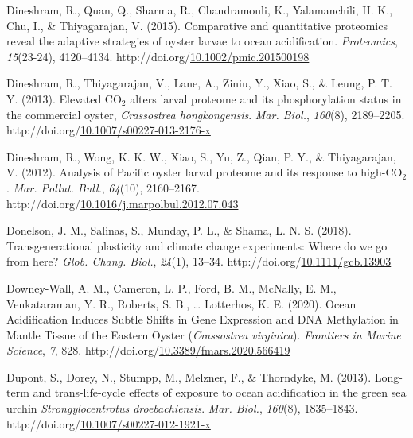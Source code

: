 \documentclass [11pt, proquest] {uwthesis}[2015/03/03]
\newlength{\cslhangindent}
\newenvironment{CSLReferences}%
{\setlength{\parindent}{0pt}%
\everypar{\setlength{\hangindent}{\cslhangindent}}\ignorespaces}%
{\par}
\begin{document}
\begin{CSLReferences}{1}{0}
\leavevmode\hypertarget{ref-Dineshram2015}{}%
Dineshram, R., Quan, Q., Sharma, R., Chandramouli, K., Yalamanchili, H. K., Chu, I., \& Thiyagarajan, V. (2015). {Comparative and quantitative proteomics reveal the adaptive strategies of oyster larvae to ocean acidification}. \emph{Proteomics}, \emph{15}(23-24), 4120--4134. http://doi.org/\href{https://doi.org/10.1002/pmic.201500198}{10.1002/pmic.201500198}

\leavevmode\hypertarget{ref-Dineshram2013}{}%
Dineshram, R., Thiyagarajan, V., Lane, A., Ziniu, Y., Xiao, S., \& Leung, P. T. Y. (2013). {Elevated {CO\(_2\)} alters larval proteome and its phosphorylation status in the commercial oyster, \emph{Crassostrea hongkongensis}}. \emph{Mar. Biol.}, \emph{160}(8), 2189--2205. http://doi.org/\href{https://doi.org/10.1007/s00227-013-2176-x}{10.1007/s00227-013-2176-x}

\leavevmode\hypertarget{ref-Dineshram2012}{}%
Dineshram, R., Wong, K. K. W., Xiao, S., Yu, Z., Qian, P. Y., \& Thiyagarajan, V. (2012). {Analysis of Pacific oyster larval proteome and its response to high-{CO\(_2\)}}. \emph{Mar. Pollut. Bull.}, \emph{64}(10), 2160--2167. http://doi.org/\href{https://doi.org/10.1016/j.marpolbul.2012.07.043}{10.1016/j.marpolbul.2012.07.043}

\leavevmode\hypertarget{ref-Donelson2018}{}%
Donelson, J. M., Salinas, S., Munday, P. L., \& Shama, L. N. S. (2018). {Transgenerational plasticity and climate change experiments: Where do we go from here?} \emph{Glob. Chang. Biol.}, \emph{24}(1), 13--34. http://doi.org/\href{https://doi.org/10.1111/gcb.13903}{10.1111/gcb.13903}

\leavevmode\hypertarget{ref-Downey-Wall2020}{}%
Downey-Wall, A. M., Cameron, L. P., Ford, B. M., McNally, E. M., Venkataraman, Y. R., Roberts, S. B., \ldots{} Lotterhos, K. E. (2020). {Ocean Acidification Induces Subtle Shifts in Gene Expression and DNA Methylation in Mantle Tissue of the Eastern Oyster (\emph{Crassostrea virginica})}. \emph{Frontiers in Marine Science}, \emph{7}, 828. http://doi.org/\href{https://doi.org/10.3389/fmars.2020.566419}{10.3389/fmars.2020.566419}

\leavevmode\hypertarget{ref-Dupont2013}{}%
Dupont, S., Dorey, N., Stumpp, M., Melzner, F., \& Thorndyke, M. (2013). {Long-term and trans-life-cycle effects of exposure to ocean acidification in the green sea urchin \emph{Strongylocentrotus droebachiensis}}. \emph{Mar. Biol.}, \emph{160}(8), 1835--1843. http://doi.org/\href{https://doi.org/10.1007/s00227-012-1921-x}{10.1007/s00227-012-1921-x}


\end{CSLReferences}
\end{document}
